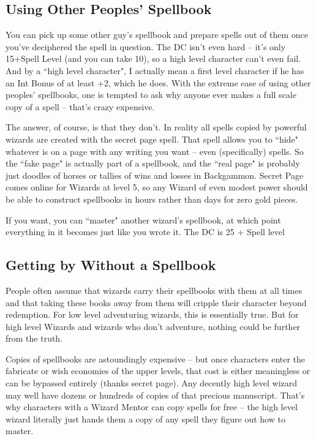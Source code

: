 \subsection{Using Other Peoples' Spellbook}

You can pick up some other guy's spellbook and prepare spells out of them once you've deciphered the spell in question. The DC isn't even hard -- it's only 15+Spell Level (and you can take 10), so a high level character can't even fail. And by a ``high level character", I actually mean a first level character if he has an Int Bonus of at least +2, which he does. With the extreme ease of using other peoples' spellbooks, one is tempted to ask why anyone ever makes a full scale copy of a spell -- that's crazy expensive.

The answer, of course, is that they don't. In reality all spells copied by powerful wizards are created with the secret page spell. That spell allows you to ``hide" whatever is on a page with any writing you want -- even (specifically) spells. So the ``fake page" is actually part of a spellbook, and the ``real page" is probably just doodles of horses or tallies of wins and losses in Backgammon. Secret Page comes online for Wizards at level 5, so any Wizard of even modest power should be able to construct spellbooks in hours rather than days for zero gold pieces.

If you want, you can ``master" another wizard's spellbook, at which point everything in it becomes just like you wrote it. The DC is 25 + Spell level

\subsection{Getting by Without a Spellbook}

People often assume that wizards carry their spellbooks with them at all times and that taking these books away from them will cripple their character beyond redemption. For low level adventuring wizards, this is essentially true. But for high level Wizards and wizards who don't adventure, nothing could be further from the truth.

Copies of spellbooks are astoundingly expensive -- but once characters enter the fabricate or wish economies of the upper levels, that cost is either meaningless or can be bypassed entirely (thanks secret page). Any decently high level wizard may well have dozens or hundreds of copies of that precious manuscript. That's why characters with a Wizard Mentor can copy spells for free -- the high level wizard literally just hands them a copy of any spell they figure out how to master.

